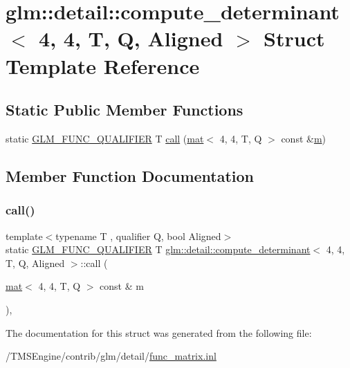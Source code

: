 \hypertarget{structglm_1_1detail_1_1compute__determinant_3_014_00_014_00_01_t_00_01_q_00_01_aligned_01_4}{}\section{glm\+:\+:detail\+:\+:compute\+\_\+determinant$<$ 4, 4, T, Q, Aligned $>$ Struct Template Reference}
\label{structglm_1_1detail_1_1compute__determinant_3_014_00_014_00_01_t_00_01_q_00_01_aligned_01_4}
\subsection*{Static Public Member Functions}
\begin{DoxyCompactItemize}
\item 
static \hyperlink{setup_8hpp_a33fdea6f91c5f834105f7415e2a64407}{G\+L\+M\+\_\+\+F\+U\+N\+C\+\_\+\+Q\+U\+A\+L\+I\+F\+I\+ER} T \hyperlink{structglm_1_1detail_1_1compute__determinant_3_014_00_014_00_01_t_00_01_q_00_01_aligned_01_4_aa3ac8758c4b0477657d8df5061017f2e}{call} (\hyperlink{structglm_1_1mat}{mat}$<$ 4, 4, T, Q $>$ const \&\hyperlink{_s_d_l__opengl__glext_8h_af593500c283bf1a787a6f947f503a5c2}{m})
\end{DoxyCompactItemize}


\subsection{Member Function Documentation}
\mbox{\label{structglm_1_1detail_1_1compute__determinant_3_014_00_014_00_01_t_00_01_q_00_01_aligned_01_4_aa3ac8758c4b0477657d8df5061017f2e}} 
\subsubsection{\texorpdfstring{call()}{call()}}
{\footnotesize\ttfamily template$<$typename T , qualifier Q, bool Aligned$>$ \\
static \hyperlink{setup_8hpp_a33fdea6f91c5f834105f7415e2a64407}{G\+L\+M\+\_\+\+F\+U\+N\+C\+\_\+\+Q\+U\+A\+L\+I\+F\+I\+ER} T \hyperlink{structglm_1_1detail_1_1compute__determinant}{glm\+::detail\+::compute\+\_\+determinant}$<$ 4, 4, T, Q, Aligned $>$\+::call (\begin{DoxyParamCaption}\item[{\hyperlink{structglm_1_1mat}{mat}$<$ 4, 4, T, Q $>$ const \&}]{m }\end{DoxyParamCaption})\hspace{0.3cm}{\ttfamily [inline]}, {\ttfamily [static]}}



The documentation for this struct was generated from the following file\+:\begin{DoxyCompactItemize}
\item 
/\+T\+M\+S\+Engine/contrib/glm/detail/\hyperlink{func__matrix_8inl}{func\+\_\+matrix.\+inl}\end{DoxyCompactItemize}
